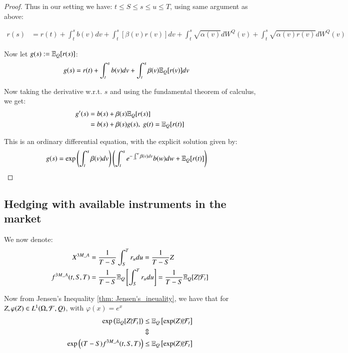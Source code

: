 \begin{proof}
Thus in our setting we have: $t\leq S \leq s \leq u \leq T$, using same argument as above: 

\begin{align*}
r(s) &= r(t) + \int_{t}^{s}b(v)dv + \int_{t}^{s}[\beta(v)r(v)]dv
+ \int_{t}^{s}\sqrt{\alpha(v)}dW^{Q}(v)
+ \int_{t}^{s}\sqrt{\alpha(v)r(v)}dW^{Q}(v)    
\end{align*}

Now let $g(s) := \mathbb{E}_{Q}[r(s)]$: 
\begin{align*}
g(s) &= r(t) + \int_{t}^{s}b(v)dv + \int_{t}^{s}\beta(v)\mathbb{E}_{Q}[r(v)]dv
\end{align*}

Now taking the derivative w.r.t. $s$ and using the fundamental theorem of calculus, we get: 
\begin{align*}
g'(s) &= b(s) + \beta(s)\mathbb{E}_{Q}[r(s)] \\ 
&= b(s) + \beta(s)g(s), \; g(t) = \mathbb{E}_{Q}[r(t)]
\end{align*}

This is an ordinary differential equation, with the explicit solution given by:
\begin{align*}
 g(s) &= \exp\left(
 \int_{t}^{s}\beta(v)dv
 \right)
 \left(
 \int_{t}^{s}e^{-\int_{t}^{w}\beta(v)dv}b(w)dw + \mathbb{E}_{Q}[r(t)]
 \right)
\end{align*}
\end{proof}


\subsection{Hedging with available instruments in the market}

We now denote: 
\begin{align*}
X^{3M\_A} &= \frac{1}{T-S}\int_{S}^{T}r_{u}du = \frac{1}{T-S}Z \\ 
f^{3M\_A}(t,S,T) &= \frac{1}{T-S}\mathbb{E}_{Q}\left[
\int_{S}^{T}r_{u}du
\right] = \frac{1}{T-S}\mathbb{E}_{Q}[Z|\mathcal{F}_{t}]
\end{align*}

Now from Jensen's Inequality \ref{thm: Jensen's_ineuality}, we have that for $Z, \varphi(Z) \in L^{1}(\Omega, \mathcal{F}, Q)$, with $\varphi(x) = e^{x}$
\begin{align}
\label{eq: hedging_availible_inst_market_1}
\exp\left(
\mathbb{E}_{Q}[Z|\mathcal{F}_{t}]
\right)
&\leq 
\mathbb{E}_{Q}\left[
\exp(Z)|\mathcal{F}_{t}
\right] \nonumber \\ 
&\Updownarrow \nonumber \\ 
\exp\left(
(T-S)f^{3M\_A}(t,S,T)
\right) 
&\leq 
\mathbb{E}_{Q}\left[\exp(Z)|\mathcal{F}_{t}\right]
\end{align} 

